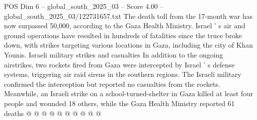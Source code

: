 \begin{textsample}{POS Dim 6 – global\_south\_2025\_03 – Score 4.00 – global\_south\_2025\_03/122731657.txt}
The death toll from the 17-month war has now surpassed 50,000, according to the Gaza Health Ministry.
Israel ' s air and ground operations have resulted in hundreds of fatalities since the truce broke down, with strikes targeting various locations in Gaza, including the city of Khan Younis.
Israeli military strikes and casualties In addition to the ongoing airstrikes, two rockets fired from Gaza were intercepted by Israel ' s defense systems, triggering air raid sirens in the southern regions.
The Israeli military confirmed the interception but reported no casualties from the rockets.
Meanwhile, an Israeli strike on a school-turned-shelter in Gaza killed at least four people and wounded 18 others, while the Gaza Health Ministry reported 61 deaths @ @ @ @ @ @ @ @ @ @

\end{textsample}
